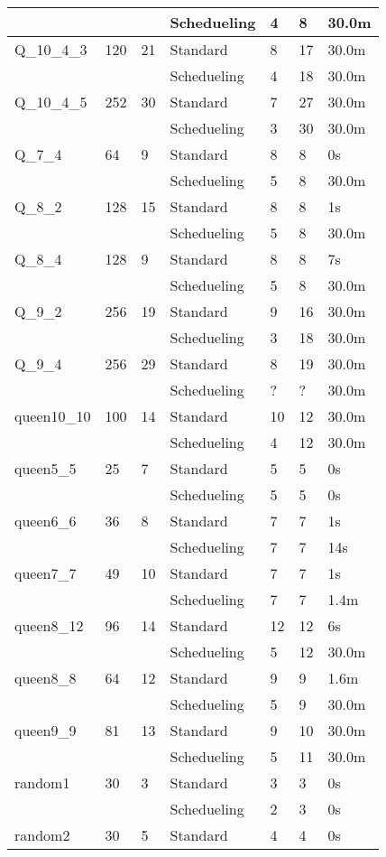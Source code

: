 \begin{longtable}{|lll|l|l|l|l|}
\cline{4-7}
&&&Schedueling&4  &8 &30.0m\\
\hline
Q\_10\_4\_3&120&21&Standard&8&17&30.0m\\
\cline{4-7}
&&&Schedueling&4  &18 &30.0m\\
\hline
Q\_10\_4\_5&252&30&Standard&7&27&30.0m\\
\cline{4-7}
&&&Schedueling&3  &30 &30.0m\\
\hline
Q\_7\_4&64&9&Standard&8&8&0s\\
\cline{4-7}
&&&Schedueling&5  &8 &30.0m\\
\hline
Q\_8\_2&128&15&Standard&8&8&1s\\
\cline{4-7}
&&&Schedueling&5  &8 &30.0m\\
\hline
Q\_8\_4&128&9&Standard&8&8&7s\\
\cline{4-7}
&&&Schedueling&5  &8 &30.0m\\
\hline
Q\_9\_2&256&19&Standard&9&16&30.0m\\
\cline{4-7}
&&&Schedueling&3  &18 &30.0m\\
\hline
Q\_9\_4&256&29&Standard&8&19&30.0m\\
\cline{4-7}
&&&Schedueling&?  &? &30.0m\\
\hline
queen10\_10&100&14&Standard&10&12&30.0m\\
\cline{4-7}
&&&Schedueling&4  &12 &30.0m\\
\hline
queen5\_5&25&7&Standard&5&5&0s\\
\cline{4-7}
&&&Schedueling&5  &5 &0s\\
\hline
queen6\_6&36&8&Standard&7&7&1s\\
\cline{4-7}
&&&Schedueling&7  &7 &14s\\
\hline
queen7\_7&49&10&Standard&7&7&1s\\
\cline{4-7}
&&&Schedueling&7  &7 &1.4m\\
\hline
queen8\_12&96&14&Standard&12&12&6s\\
\cline{4-7}
&&&Schedueling&5  &12 &30.0m\\
\hline
queen8\_8&64&12&Standard&9&9&1.6m\\
\cline{4-7}
&&&Schedueling&5  &9 &30.0m\\
\hline
queen9\_9&81&13&Standard&9&10&30.0m\\
\cline{4-7}
&&&Schedueling&5  &11 &30.0m\\
\hline
random1&30&3&Standard&3&3&0s\\
\cline{4-7}
&&&Schedueling&2  &3 &0s\\
\hline
random2&30&5&Standard&4&4&0s\\

\end{longtable}
